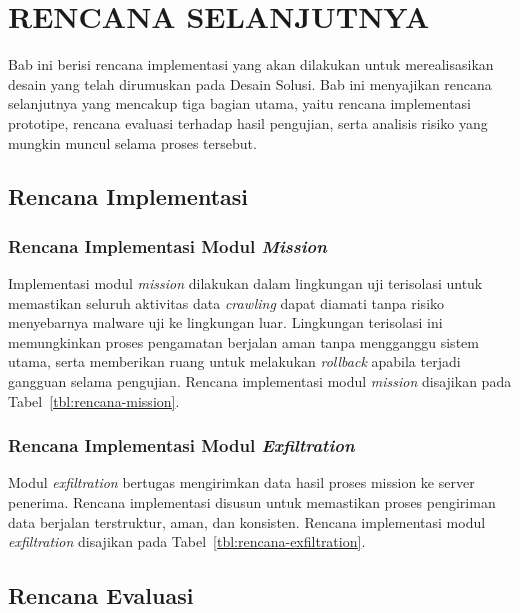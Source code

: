 \setcounter{chapter}{4}
\chapter{RENCANA SELANJUTNYA}
\label{chap:rencana-selanjutnya}
Bab ini berisi rencana implementasi yang akan dilakukan untuk merealisasikan desain yang telah 
dirumuskan pada Desain Solusi. Bab ini menyajikan rencana selanjutnya yang mencakup tiga bagian 
utama, yaitu rencana implementasi prototipe, rencana evaluasi terhadap hasil pengujian, serta 
analisis risiko yang mungkin muncul selama proses tersebut.

\section{Rencana Implementasi}

\subsection{Rencana Implementasi Modul \textit{Mission}}

Implementasi modul \textit{mission} dilakukan dalam lingkungan uji terisolasi untuk memastikan 
seluruh aktivitas data \textit{crawling} dapat diamati tanpa risiko menyebarnya malware uji ke 
lingkungan luar. Lingkungan terisolasi ini memungkinkan proses pengamatan berjalan aman tanpa 
mengganggu sistem utama, serta memberikan ruang untuk melakukan \textit{rollback} apabila terjadi 
gangguan selama pengujian. Rencana implementasi modul \textit{mission} disajikan pada 
Tabel~\ref{tbl:rencana-mission}.



\subsection{Rencana Implementasi Modul \textit{Exfiltration}}

Modul \textit{exfiltration} bertugas mengirimkan data hasil proses mission ke server penerima. 
Rencana implementasi disusun untuk memastikan proses pengiriman data berjalan terstruktur, aman, dan 
konsisten. Rencana implementasi modul \textit{exfiltration} disajikan pada Tabel~\ref{tbl:rencana-exfiltration}.



\section{Rencana Evaluasi}

